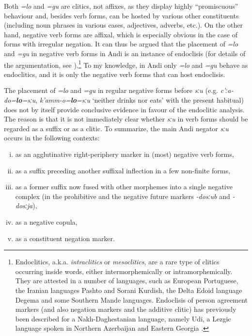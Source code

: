 \documentclass[output=paper,colorlinks=true, citecolor=brown]{langscibook}
\begin{document}
Both \textit{=lo} and \textit{=gu} are clitics, not affixes, as they display highly “promiscuous” behaviour and, besides verb forms, can be hosted by various other constituents (including noun phrases in various cases, adjectives, adverbs, etc.). On the other hand, negative verb forms are affixal, which is especially obvious in the case of forms with irregular negation. It can thus be argued that the placement of \textit{=lo} and \textit{=gu} in negative verb forms in Andi is an instance of endoclisis (for details of the argumentation, see \citealt{Maisak2021}).\footnote{Endoclitics, a.k.a. \textit{intraclitics} or \textit{mesoclitics}, are a rare type of clitics occurring inside words, either intermorphemically or intramorphemically. They are attested in a number of languages, such as European Portuguese, the Iranian languages Pashto and Sorani Kurdish, the Delta Edoid language Degema and some Southern Mande languages. Endoclisis of person agreement markers (and also negation markers and the additive clitic) has previously been described for a Nakh-Daghestanian language, namely Udi, a Lezgic language spoken in Northern Azerbaijan and Eastern Georgia \citep{Harris2002}.} To my knowledge, in Andi only \textit{=lo} and \textit{=gu} behave as endoclitics, and it is only the negative verb forms that can host endoclisis.

The placement of \textit{=lo} and \textit{=gu} in regular negative forms before \textit{sːu} (e.g. \textit{c’ːa-do=}\textbf{\textit{lo}}\textit{=sːu}, \textit{k’amm{}-o=}\textbf{\textit{lo}}\textit{=sːu} ‘neither drinks nor eats’ with the present habitual) does not by itself provide conclusive evidence in favour of the endoclitic analysis. The reason is that it is not immediately clear whether \textit{sːu} in verb forms should be regarded as a suffix or as a clitic. To summarize, the main Andi negator \textit{sːu} occurs in the following contexts:

\begin{enumerate}[i.]
    \item as an agglutinative right-periphery marker in (most) negative verb forms, 
    \item as a suffix preceding another suffixal inflection in a few non-finite forms, 
    \item as a former suffix now fused with other morphemes into a single negative complex (in the prohibitive and the negative future markers \textit{{}-dosːub} and \textit{{}-dosːja}),
    \item as a negative copula, 
    \item as a constituent negation marker.
\end{enumerate}
\end{document}
